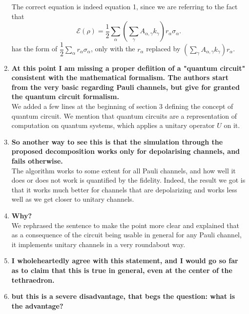 \documentclass[10pt,letterpaper]{article} %
\begin{document}
\begin{enumerate}
The correct equation is indeed equation 1, since we are referring to the fact that 
\begin{equation}
\label{eq: rho-transformada}
\mathcal{E}(\rho) = \dfrac{1}{2} \sum_{\alpha} \left(\sum_{\gamma} A_{\alpha, \gamma} k_{\gamma} \right) r_{\alpha} \sigma_{\alpha}.
\end{equation}
has the form of $\dfrac{1}{2} \sum_{\alpha} r_{\alpha} \sigma_{\alpha}$, only with the
$r_{\alpha}$ replaced by $\left( \sum_{\gamma} A_{\alpha,\gamma} k_{\gamma} \right) r_{\alpha}$.


\item \textbf{ At this point I am missing a proper defiition of a "quantum circuit" consistent with the mathematical formalism. The authors start from the very basic regarding Pauli channels, but give for granted the quantum circuit formalism.} \\

We added a few lines at the beginning of section 3 defining the concept of quantum circuit.
We  mention that quantum circuits are a representation of computation on quantum systems, which applies a unitary operator $U$ on it. 

\item  \textbf{So another way to see this is that the simulation through the proposed decomposition works only for depolarising channels, and fails otherwise.}\\

The algorithm works to some extent for all Pauli channels, and how well
it does or does not work is quantified by the fidelity.
Indeed, the result we got is that it works much better for channels that are depolarizing
and works less well as we get closer to unitary channels.


\item \textbf{Why?}\\
We rephrased the sentence to make the point more clear
and explained that as a consequence of the circuit being usable in general for any Pauli channel,
it implements unitary channels in a very roundabout way.



\item \textbf{I wholeheartedly agree with this statement, and I would go so far as to claim that this is true in general, even at the center of the tethraedron.} \\



\item \textbf{but this is a severe disadvantage, that begs the question: what is the advantage?} \\


\end{enumerate}
\end{document}
